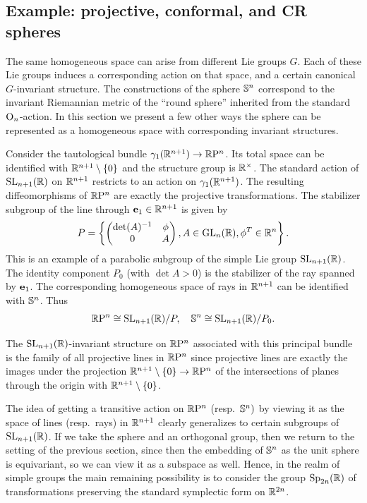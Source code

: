 \subsection{Example: projective, conformal, and CR spheres}\label{sec: projective, conformal CR spheres}

The same homogeneous space can arise from different Lie groups $G$. Each of these Lie groups induces a corresponding action on that space, and a certain canonical $G$-invariant structure. The constructions of the sphere $\bbS^n$ correspond to the invariant Riemannian metric of the ``round sphere'' inherited from the standard $\Or_n$-action. In this section we present a few other ways the sphere can be represented as a homogeneous space with corresponding invariant structures.

\begin{defn}
    Consider the tautological bundle $\gamma_1(\bbR^{n+1})\to \RP^n$. Its total space can be identified with $\bbR^{n+1}\setminus\{0\}$ and the structure group is $\bbR^\times$. The standard action of $\SL_{n+1}(\bbR)$ on $\bbR^{n+1}$ restricts to an action on $\gamma_1(\bbR^{n+1})$. The resulting diffeomorphisms of $\RP^n$ are exactly the projective transformations. The stabilizer subgroup of the line through $\bf{e}_1\in\bbR^{n+1}$ is given by
    \[P=\left\{\begin{pmatrix}
        \det(A)^{-1}&\phi\\
        0&A\end{pmatrix}, A\in\GL_n(\bbR),\phi^T\in\bbR^{n}\right\}.\]
    This is an example of a parabolic subgroup of the simple Lie group $\SL_{n+1}(\bbR)$. 
    The identity component $P_0$ (with $\det A>0$) is the stabilizer of the ray spanned by $\bf{e}_1$. The corresponding homogeneous space of rays in $\bbR^{n+1}$ can be identified with $\bbS^n$.
    Thus
    \[\RP^n\cong \SL_{n+1}(\bbR)\slash P,\quad \bbS^n\cong  \SL_{n+1}(\bbR)\slash P_0.\]
\end{defn}

The $\SL_{n+1}(\bbR)$-invariant structure on $\RP^n$ associated with this principal bundle is the family of all projective lines in $\RP^n$ since projective lines are exactly the images under the projection $\bbR^{n+1}\setminus\{0\}\to \RP^n$ of the intersections of planes through the origin with $\bbR^{n+1}\setminus\{0\}$.

The idea of getting a transitive action on $\RP^n$ (resp.~$\bbS^n)$ by viewing it as the space of lines (resp.~rays) in $\bbR^{n+1}$ clearly generalizes to certain subgroups of $\SL_{n+1}(\bbR)$. If we take the sphere and an orthogonal group, then we return to the setting of the previous section, since then the embedding of $\bbS^n$ as the unit sphere is equivariant, so we can view it as a subspace as well. Hence, in the realm of simple groups the main remaining possibility is to consider the group $\Sp_{2n}(\bbR)$ of transformations preserving the standard symplectic form on $\bbR^{2n}$.

